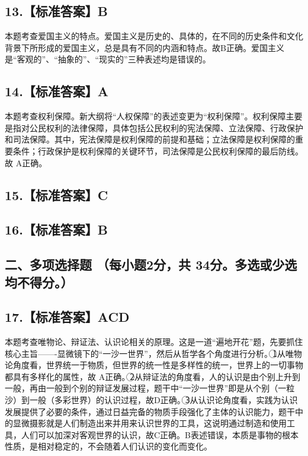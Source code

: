 \documentclass[UTF8,11pt]{ctexart}
\begin{document}
\subsection*{13.【标准答案】B}

本题考查爱国主义的特点。爱国主义是历史的、具体的，在不同的历史条件和文化背景下所形成的爱国主义，总是具有不同的内涵和特点。故B正确。爱国主义是“客观的”、“抽象的”、“现实的”三种表述均是错误的。


\subsection*{14.【标准答案】A}

本题考查权利保障。新大纲将“人权保障”的表述变更为“权利保障”。权利保障主要是指对公民权利的法律保障，具体包括公民权利的宪法保障、立法保障、行政保护和司法保障。其中，宪法保障是权利保障的前提和基础；立法保障是权利保障的重要条件；行政保护是权利保障的关键环节，司法保障是公民权利保障的最后防线。故 A正确。


\subsection*{15.【标准答案】C}

\subsection*{16.【标准答案】B}

\subsection*{二、多项选择题 （每小题2分，共 34分。多选或少选均不得分。）}

\subsection*{17.【标准答案】ACD}

本题考查唯物论、辩证法、认识论相关的原理。这是一道“遍地开花”题，先要抓住核心主旨——-显微镜下的“一沙一世界”，然后从哲学各个角度进行分析。\textcircled{1}从唯物论角度看，世界统一于物质，但世界的统一性是多样性的统一，世界上的一切事物都具有多样化的属性，故 A正确。\textcircled{2}从辩证法的角度看，人的认识是由个别上升到一般，再由一般到个别的辩证发展过程，题干中“一沙一世界”即是从个别（一粒沙）到一般（多彩世界）的认识过程，故D正确。\textcircled{3}从认识论角度看，实践为认识发展提供了必要的条件，通过日益完备的物质手段强化了主体的认识能力，题干中的显微摄影就是人们制造出来并用来认识世界的工具，这说明通过制造和使用工具，人们可以加深对客观世界的认识，故C正确。B表述错误，本质是事物的根本性质，是相对稳定的，不会随着人们认识的变化而变化。
\end{document}
